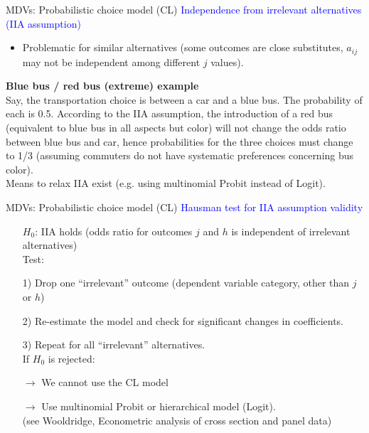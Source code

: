 \documentclass[usenames,dvipsnames]{beamer}
\begin{document}
\begin{frame}{MDVs: Probabilistic choice model (CL)}
\textcolor{Blue}{Independence from irrelevant alternatives (IIA assumption)} \\
\begin{itemize}
\item Problematic for similar alternatives (some outcomes are close substitutes, $a_{ij}$ may not be independent among different $j$ values). \\
\end{itemize}
\medskip
\textbf{Blue bus / red bus (extreme) example}\\
\smallskip
Say, the transportation choice is between a car and a blue bus. The probability of each is 0.5. According to the IIA assumption, the introduction of a red bus (equivalent to blue bus in all aspects but color) will not change the odds ratio between blue bus and car, hence probabilities for the three choices must change to 1/3 (assuming commuters do not have systematic preferences concerning bus color).\\
\smallskip
Means to relax IIA exist (e.g. using multinomial Probit instead of Logit).
\end{frame}
\begin{frame}{MDVs: Probabilistic choice model (CL)}
\textcolor{Blue}{Hausman test for IIA assumption validity} \\
\medskip
\begin{itemize}
\item[$H_0$:] IIA holds (odds ratio for outcomes $j$ and $h$ is independent of irrelevant alternatives) \\
\bigskip
Test:\\
\item[1)] Drop one ``irrelevant'' outcome (dependent variable category, other than $j$ or $h$)
\item[2)] Re-estimate the model and check for significant changes in coefficients.
\item[3)] Repeat for all ``irrelevant'' alternatives. \\
\bigskip
If $H_0$ is rejected: \\
\smallskip
\item[$\to$] We cannot use the CL model
\item[$\to$] Use multinomial Probit or hierarchical model (Logit). \\
\footnotesize (see Wooldridge, Econometric analysis of cross section and panel data)
\end{itemize}
\end{frame}
\end{document}
